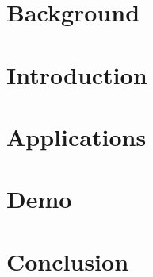 \section[Back]{Background}


\section[Intro]{Introduction}


\section[Apps]{Applications}


\section[Demo]{Demo}


\section[Concl]{Conclusion}
